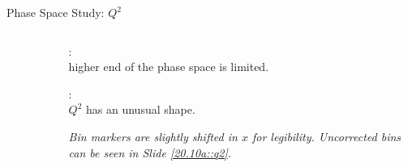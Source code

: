 \begin{frame}{Phase Space Study: $Q^2$}
    \label{12.12::q2}

    \begin{columns}[onlytextwidth,T]

    \begin{column}{.80\linewidth}
        \vspace{-15pt}
        \begin{center}
            \begin{figure}[t]
            \end{figure}
        \end{center}
    \end{column}

    \begin{column}{.18\linewidth}
        \small{:\\ higher end of the phase space is limited.}

        \vspace{12pt}

        \small{:\\ $Q^2$ has an unusual shape.}

        \vspace{12pt}

        \small{}

        \vspace{15pt}

        \begin{flushright}
            \tiny{\textit{
                Bin markers are slightly shifted in $x$ for legibility.
                Uncorrected bins can be seen in Slide \textcolor{efd_purple}{\ref{20.10a::q2}}.
            }}
        \end{flushright}
    \end{column}

    \end{columns}
\end{frame}


